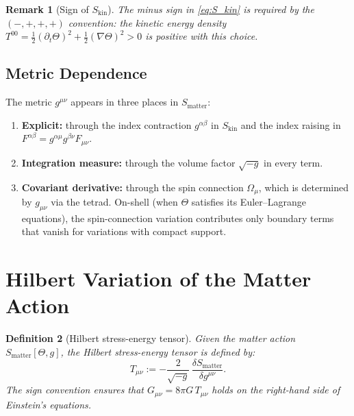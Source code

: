 \documentclass[12pt]{article}
\newtheorem{definition}{Definition}[section]
\newtheorem{remark}[definition]{Remark}
\begin{document}
\begin{remark}[Sign of $S_{\mathrm{kin}}$]
The minus sign in \eqref{eq:S_kin} is required by the $(-,+,+,+)$ convention:
the kinetic energy density $T^{00} = \tfrac{1}{2}(\partial_t\Theta)^2 +
\tfrac{1}{2}(\nabla\Theta)^2 > 0$ is positive with this choice.
\end{remark}

\subsection{Metric Dependence}

The metric $g^{\mu\nu}$ appears in three places in $S_{\mathrm{matter}}$:
\begin{enumerate}
  \item \textbf{Explicit:} through the index contraction $g^{\alpha\beta}$ in
        $S_{\mathrm{kin}}$ and the index raising in $F^{\alpha\beta} =
        g^{\alpha\mu}g^{\beta\nu}F_{\mu\nu}$.
  \item \textbf{Integration measure:} through the volume factor $\sqrt{-g}$
        in every term.
  \item \textbf{Covariant derivative:} through the spin connection $\Omega_\mu$,
        which is determined by $g_{\mu\nu}$ via the tetrad.  On-shell (when
        $\Theta$ satisfies its Euler--Lagrange equations), the spin-connection
        variation contributes only boundary terms that vanish for variations
        with compact support.
\end{enumerate}

\section{Hilbert Variation of the Matter Action}
\label{sec:variation}

\begin{definition}[Hilbert stress-energy tensor]
\label{def:hilbert}
Given the matter action $S_{\mathrm{matter}}[\Theta, g]$, the
\emph{Hilbert stress-energy tensor} is defined by:
\begin{equation}
  \label{eq:hilbert}
  T_{\mu\nu} := -\frac{2}{\sqrt{-g}}\,
    \frac{\delta S_{\mathrm{matter}}}{\delta g^{\mu\nu}}.
\end{equation}
The sign convention ensures that $G_{\mu\nu} = 8\pi G\,T_{\mu\nu}$ holds on
the right-hand side of Einstein's equations.
\end{definition}
\end{document}
